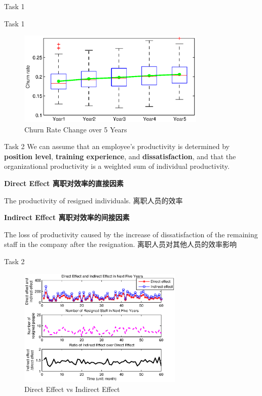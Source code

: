 \documentclass{beamer}
\begin{document}
\begin{CJK*}{UTF8}{gbsn}
\begin{frame}{Task 1}
\end{frame}

\begin{frame}{Task 1}
\begin{figure}
\centering
\includegraphics[width=0.8\textwidth]{fig/task-1-2.eps}
\caption{Churn Rate Change over 5 Years}
\end{figure}
\end{frame}

\begin{frame}{Task 2}
We can assume that an employee's productivity is determined by \textbf{position level}, \textbf{training experience}, and \textbf{dissatisfaction}, and that the organizational productivity is a weighted sum of individual productivity. \\\vspace{0.5em}

\textbf{Direct Effect 离职对效率的直接因素}

The productivity of resigned individuals. 离职人员的效率 \vspace{0.5em}

\textbf{Indirect Effect 离职对效率的间接因素}

The loss of productivity caused by the increase of dissatisfaction of the remaining staff in the company after the resignation. 离职人员对其他人员的效率影响


\end{frame}

\begin{frame}{Task 2}
\begin{figure}
\centering
\includegraphics[width=0.70\textwidth]{fig/task-2.eps}
\caption{Direct Effect vs Indirect Effect}
\end{figure}
\end{frame}


\end{CJK*}
\end{document}
